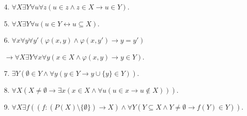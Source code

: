 \documentclass[a4paper,11pt]{article}
\begin{document}
4. $\forall X\exists Y\forall u\forall z(u\in z\land z\in X\to u\in Y)$.

5. $\forall X\exists Y\forall u(u\in Y\leftrightarrow u\subseteq X)$.
\medskip

6. $\forall x\forall y\forall y'(\varphi(x,y)\land\varphi(x,y')\to y=y')$

$\to\forall X\exists Y\forall x\forall y(x\in X\land\varphi(x,y)\to y\in Y)$.
\medskip

7. $\exists Y(\emptyset\in Y\land\forall y(y\in Y\to y\cup\{y\}\in Y))$.
\medskip

8. $\forall X(X\not=\emptyset\to\exists x(x\in X\land\forall u(u\in x\to u\not\in X)))$.
\medskip

9. $\forall X\exists f((f:(P(X)\setminus\{\emptyset\})\to X)\land\forall Y(Y\subseteq X\land Y\not=\emptyset\to f(Y)\in Y))$.
\end{document}

